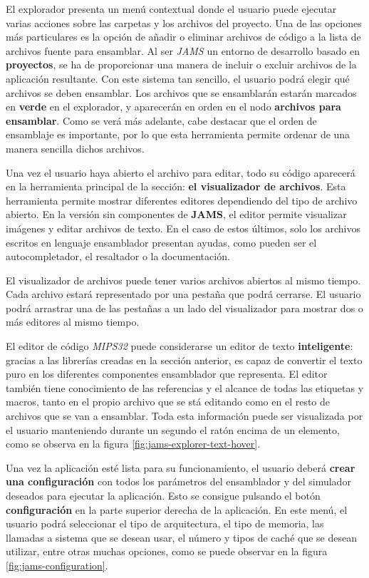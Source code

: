 El explorador presenta un menú contextual donde el usuario
puede ejecutar varias acciones sobre las carpetas y los archivos
del proyecto.
Una de las opciones más particulares es la opción de añadir o eliminar
archivos de código a la lista de archivos fuente para ensamblar.
Al ser \textit{JAMS} un entorno de desarrollo basado en \textbf{proyectos},
se ha de proporcionar una manera de incluir o excluir archivos de
la aplicación resultante.
Con este sistema tan sencillo, el usuario podrá elegir qué archivos se deben ensamblar.
Los archivos que se ensamblarán estarán marcados en \textbf{verde} en el explorador,
y aparecerán en orden en el nodo \textbf{archivos para ensamblar}.
Como se verá más adelante, cabe destacar que el orden de ensamblaje
es importante, por lo que esta herramienta permite ordenar de una manera
sencilla dichos archivos.

Una vez el usuario haya abierto el archivo para editar, todo su código
aparecerá en la herramienta principal de la sección: \textbf{el visualizador
de archivos}.
Esta herramienta permite mostrar diferentes editores dependiendo del tipo
de archivo abierto.
En la versión sin componentes de \textbf{JAMS}, el editor permite visualizar
imágenes y editar archivos de texto.
En el caso de estos últimos, solo los archivos escritos en
lenguaje ensamblador presentan ayudas, como pueden ser el autocompletador,
el resaltador o la documentación.

El visualizador de archivos puede tener varios archivos abiertos
al mismo tiempo.
Cada archivo estará representado por una pestaña que podrá cerrarse.
El usuario podrá arrastrar una de las pestañas a un lado del visualizador
para mostrar dos o más editores al mismo tiempo.

El editor de código \textit{MIPS32} puede considerarse un editor
de texto \textbf{inteligente}: gracias a las librerías creadas en la sección
anterior, es capaz de convertir el texto puro en los diferentes componentes
ensamblador que representa.
El editor también tiene conocimiento de las referencias y el alcance de
todas las etiquetas y macros, tanto en el propio archivo que se stá editando
como en el resto de archivos que se van a ensamblar.
Toda esta información puede ser visualizada por el usuario manteniendo
durante un segundo el ratón encima de un elemento, como se observa
en la figura \ref{fig:jams-explorer-text-hover}.

Una vez la aplicación esté lista para su funcionamiento,
el usuario deberá \textbf{crear una configuración} con todos los parámetros
del ensamblador y del simulador deseados para ejecutar la aplicación.
Esto se consigue pulsando el botón \textbf{configuración} en la parte
superior derecha de la aplicación.
En este menú, el usuario podrá seleccionar el tipo de arquitectura,
el tipo de memoria, las llamadas a sistema que se desean usar,
 el número y tipos de caché que se desean utilizar, entre otras
muchas opciones, como se puede observar en la figura \ref{fig:jams-configuration}.

